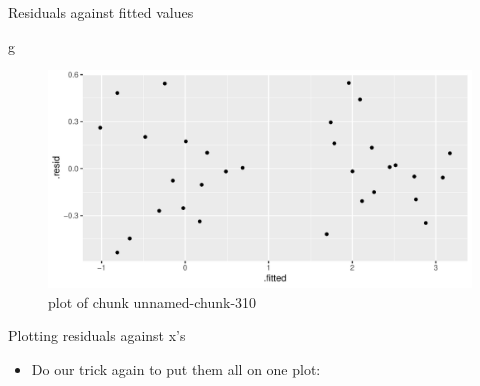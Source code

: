 \documentclass[ignorenonframetext,]{beamer}
\newenvironment{Shaded}{\begin{snugshade}}{\end{snugshade}}
\newcommand{\DataTypeTok}[1]{\textcolor[rgb]{0.13,0.29,0.53}{#1}}
\newcommand{\DecValTok}[1]{\textcolor[rgb]{0.00,0.00,0.81}{#1}}
\newcommand{\FloatTok}[1]{\textcolor[rgb]{0.00,0.00,0.81}{#1}}
\newcommand{\KeywordTok}[1]{\textcolor[rgb]{0.13,0.29,0.53}{\textbf{#1}}}
\newcommand{\NormalTok}[1]{#1}
\newcommand{\OperatorTok}[1]{\textcolor[rgb]{0.81,0.36,0.00}{\textbf{#1}}}
\newcommand{\StringTok}[1]{\textcolor[rgb]{0.31,0.60,0.02}{#1}}
\providecommand{\tightlist}{%
  \setlength{\itemsep}{0pt}\setlength{\parskip}{0pt}}
\begin{document}
\begin{frame}[fragile]{Residuals against fitted values}
\protect\hypertarget{residuals-against-fitted-values}{}

\begin{Shaded}
\begin{Highlighting}[]
\NormalTok{g}
\end{Highlighting}
\end{Shaded}

\begin{figure}
\centering
\includegraphics{figure/unnamed-chunk-310-1.pdf}
\caption{plot of chunk unnamed-chunk-310}
\end{figure}

\end{frame}

\begin{frame}[fragile]{Plotting residuals against x's}
\protect\hypertarget{plotting-residuals-against-xs}{}

\begin{itemize}
\tightlist
\item
  Do our trick again to put them all on one plot:
\end{itemize}

\begin{Shaded}
\end{Shaded}

\end{frame}
\end{document}
